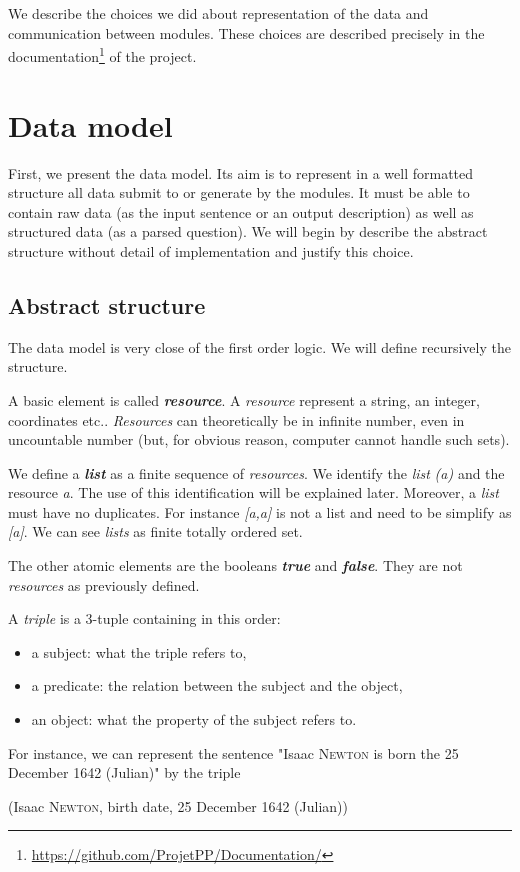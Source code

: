 We describe the choices we did about representation of the data and communication between modules.
These choices are described precisely in the documentation\footnote{\url{https://github.com/ProjetPP/Documentation/}} of the project.

\section{Data model}
\label{rdf}

First, we present the data model. Its aim is to represent in a well formatted structure all data submit to or generate by the modules. It must be able to contain raw data (as the input sentence or an output description) as well as structured data (as a parsed question). We will begin by describe the abstract structure without detail of implementation and justify this choice.

\subsection{Abstract structure}

The data model is very close of the first order logic. We will define recursively the structure.

A basic element is called \textsl{\bf resource}. A \textsl{resource} represent a string, an integer, coordinates etc.. \textsl{Resources} can theoretically be in infinite number, even in uncountable number (but, for obvious reason, computer cannot handle such sets).

We define a \textsl{\bf list} as a finite sequence of \textsl{resources}. We identify the \textsl{list} \textsl{(a)} and the resource \textsl{a}. The use of this identification will be explained later. Moreover, a \textsl{list} must have no duplicates. For instance \textsl{[a,a]} is not a list and need to be simplify as \textsl{[a]}. We can see \textsl{lists} as finite totally ordered set.

The other atomic elements are the booleans \textsl{\bf true} and \textsl{\bf false}. They are not \textsl{resources} as previously defined.

A \textsl{triple} is a 3-tuple containing in this order:
\begin{itemize}
    \item a subject: what the triple refers to,
    \item a predicate: the relation between the subject and the object,
    \item an object: what the property of the subject refers to.
\end{itemize}
For instance, we can represent the sentence "Isaac \textsc{Newton} is born the 25 December 1642 (Julian)" by the triple \begin{center}(Isaac \textsc{Newton}, birth date, 25 December 1642 (Julian))\end{center}



